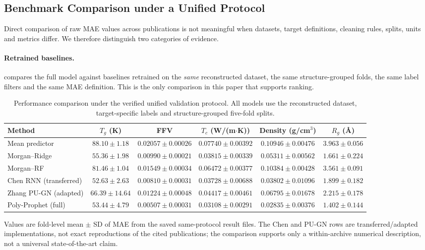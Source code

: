 \documentclass{article}
\begin{document}
\subsection{Benchmark Comparison under a Unified Protocol}

Direct comparison of raw MAE values across publications is not meaningful when datasets, target definitions, cleaning rules, splits, units and metrics differ. We therefore distinguish two categories of evidence.

\paragraph{Retrained baselines.}  compares the full model against baselines retrained on the \emph{same} reconstructed dataset, the same structure-grouped folds, the same label filters and the same MAE definition. This is the only comparison in this paper that supports ranking.

\begin{table}[H]
\centering
\caption{Performance comparison under the verified unified validation protocol. All models use the reconstructed dataset, target-specific labels and structure-grouped five-fold splits.}
\label{tab:fair_baselines}
\footnotesize
\setlength{\tabcolsep}{3.2pt}
\begin{tabular}{lccccc}
\toprule
Method & $T_g$ (K) & FFV & $T_c$ (W/(m$\cdot$K)) & Density (g/cm$^3$) & $R_g$ (\AA) \\
\midrule
Mean predictor & $88.10 \pm 1.18$ & $0.02057 \pm 0.00026$ & $0.07740 \pm 0.00392$ & $0.10946 \pm 0.00476$ & $3.963 \pm 0.056$ \\
Morgan--Ridge & $55.36 \pm 1.98$ & $0.00990 \pm 0.00021$ & $0.03815 \pm 0.00339$ & $0.05311 \pm 0.00562$ & $1.661 \pm 0.224$ \\
Morgan--RF & $81.46 \pm 1.04$ & $0.01549 \pm 0.00034$ & $0.06472 \pm 0.00377$ & $0.10384 \pm 0.00428$ & $3.561 \pm 0.091$ \\
Chen RNN (transferred) & $52.63 \pm 2.63$ & $0.00810 \pm 0.00031$ & $0.03728 \pm 0.00688$ & $0.03802 \pm 0.01096$ & $1.899 \pm 0.182$ \\
Zhang PU-GN (adapted) & $66.39 \pm 14.64$ & $0.01224 \pm 0.00048$ & $0.04417 \pm 0.00461$ & $0.06795 \pm 0.01678$ & $2.215 \pm 0.178$ \\
Poly-Prophet (full) & $53.44 \pm 4.79$ & $0.00507 \pm 0.00031$ & $0.03108 \pm 0.00291$ & $0.02835 \pm 0.00376$ & $1.402 \pm 0.144$ \\
\bottomrule
\end{tabular}

\vspace{0.5em}
\footnotesize
Values are fold-level mean $\pm$ SD of MAE from the saved same-protocol result files. The Chen and PU-GN rows are transferred/adapted implementations, not exact reproductions of the cited publications; the comparison supports only a within-archive numerical description, not a universal state-of-the-art claim.
\end{table}
\end{document}
